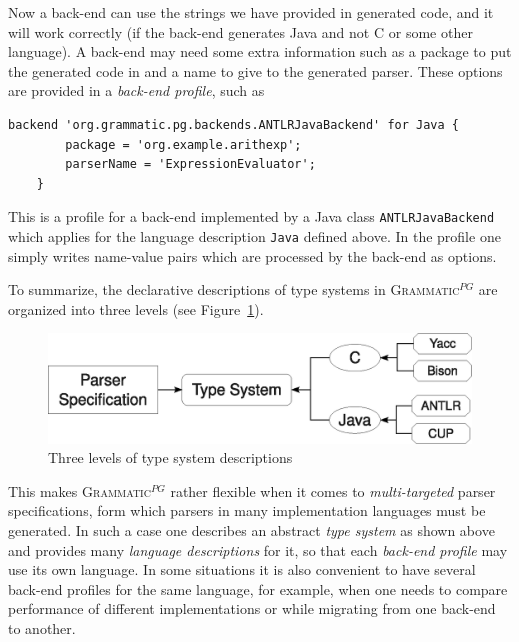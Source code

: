 \documentclass{informat} %
\newcommand{\figref}[1]{Figure~\ref{#1}}
\newcommand{\ATF}{\textsc{Grammatic}$^{PG}$}
\begin{document}
Now a back-end can use the strings we have provided in generated code, and it will work correctly (if the back-end generates Java and not C or some other language). A back-end may need some extra information such as a package to put the generated code in and a name to give to the generated parser. These options are provided in a \emph{back-end profile}, such as
\begin{lstlisting}[language=Typesystem]
	backend 'org.grammatic.pg.backends.ANTLRJavaBackend' for Java {
		package = 'org.example.arithexp';
		parserName = 'ExpressionEvaluator';
	}
\end{lstlisting}

This is a profile for a back-end implemented by a Java class \texttt{ANTLRJavaBackend} which applies for the language description \texttt{Java} defined above. In the profile one simply writes name-value pairs which are processed by the back-end as options.

To summarize, the declarative descriptions of type systems in \ATF{} are organized into three levels (see \figref{typesystem}). 

\begin{figure}[htbp]
		\includegraphics[width=\textwidth]{typesystem}
		\caption{Three levels of type system descriptions}\label{typesystem}
\end{figure}

This makes \ATF{} rather flexible when it comes to \emph{multi-targeted} parser specifications, form which parsers in many implementation languages must be generated. 
In such a case one describes an abstract \emph{type system} as shown above and provides many \emph{language descriptions} for it, so that each \emph{back-end profile} may use its own language. In some situations it is also convenient to have several back-end profiles for the same language, for example, when one needs to compare performance of different implementations or while migrating from one back-end to another.

\end{document}
